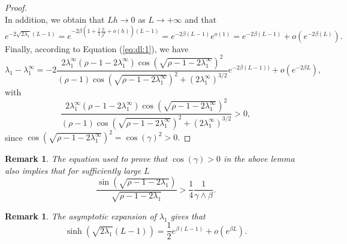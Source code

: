 \documentclass[11pt]{article}
\theoremstyle{plain}
\newtheorem{rem}[lemma]{Remark}
\newcommand\linf{\lambda_1^\infty}
\begin{document}
\begin{proof}
\begin{equation}
\end{equation}
In addition, we obtain that $Lh\rightarrow 0$ as $L\to+\infty$ and that
\begin{equation*}
    e^{-2\sqrt{2\lambda_1}(L-1)}= e^{-2\beta\left(1+\frac{1}{2}\frac{h}{\beta^2}+o(h)\right)(L-1)}=e^{-2\beta(L-1)}e^{o(1)}=e^{-2\beta(L-1)}+o(e^{-2\beta(L)}).
\end{equation*}
Finally, according to Equation (\ref{eq:dl:1}), we have
\begin{equation*}
\lambda_1-\linf= -2\frac{2\linf(\rho-1-2\linf)\cos(\sqrt{\rho-1-2\linf})^2}{(\rho-1)\cos(\sqrt{\rho-1-2\linf})^2+(2\linf)^{3/2}}e^{-2\beta (L-1))}+o(e^{-2\beta L}),
\end{equation*}
with $$\frac{2\linf(\rho-1-2\linf)\cos(\sqrt{\rho-1-2\linf})^2}{(\rho-1)\cos(\sqrt{\rho-1-2\linf})^2+(2\linf)^{3/2}}>0,$$ since $\cos(\sqrt{\rho-1-2\linf})^2=\cos(\gamma)^2>0.$
\end{proof}
\begin{rem}\label{lb:sin} The equation used to prove that $\cos(\gamma)>0$ in the above lemma  also implies that for sufficiently large $L$
\begin{equation}\label{ub:sin}
\frac{\sin(\sqrt{\rho-1-2\lambda_1})}{\sqrt{\rho-1-2\lambda_1}}>\frac{1}{4}\frac{1}{\gamma\wedge \beta}.
\end{equation}
\end{rem}
\begin{rem}\label{r:vw} The asymptotic expansion of $\lambda_1$ gives that 
\begin{equation*}
\sinh(\sqrt{2\lambda_1}(L-1))= \frac{1}{2}e^{\beta (L-1)}+o\left(e^{\beta L}\right).
\end{equation*}
\end{rem}
\end{document}
